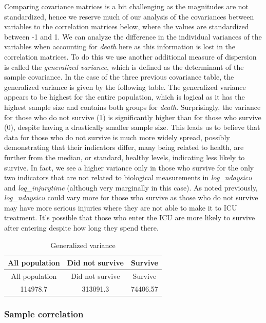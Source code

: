 \documentclass[
]{article}
\begin{document}
Comparing covariance matrices is a bit challenging as the magnitudes are
not standardized, hence we reserve much of our analysis of the
covariances between variables to the correlation matrices below, where
the values are standardized between -1 and 1. We can analyze the
difference in the individual variances of the variables when accounting
for \emph{death} here as this information is lost in the correlation
matrices. To do this we use another additional measure of dispersion is
called the \emph{generalized variance}, which is defined as the
determinant of the sample covariance. In the case of the three previous
covariance table, the generalized variance is given by the following
table. The generalized variance appears to be highest for the entire
population, which is logical as it has the highest sample size and
contains both groups for \emph{death}. Surprisingly, the variance for
those who do not survive (1) is significantly higher than for those who
survive (0), despite having a drastically smaller sample size. This
leads us to believe that data for those who do not survive is much more
widely spread, possibly demonstrating that their indicators differ, many
being related to health, are further from the median, or standard,
healthy levels, indicating less likely to survive. In fact, we see a
higher variance only in those who survive for the only two indicators
that are not related to biological measurements in \emph{log\_ndaysicu}
and \emph{log\_injurytime} (although very marginally in this case). As
noted previously, \emph{log\_ndaysicu} could vary more for those who
survive as those who do not survive may have more serious injuries where
they are not able to make it to ICU treatment. It's possible that those
who enter the ICU are more likely to survive after entering despite how
long they spend there.

\begin{longtable}[]{@{}ccc@{}}
\caption{Generalized variance}\tabularnewline
\toprule
All population & Did not survive & Survive\tabularnewline
\midrule
\endfirsthead
\toprule
All population & Did not survive & Survive\tabularnewline
\midrule
\endhead
114978.7 & 313091.3 & 74406.57\tabularnewline
\bottomrule
\end{longtable}

\hypertarget{sample-correlation}{%
\subsubsection{Sample correlation}\label{sample-correlation}}
\end{document}
